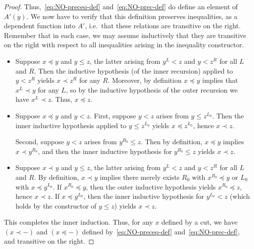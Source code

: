 \begin{proof}
  Thus,~\eqref{eq:NO-preceq-def} and~\eqref{eq:NO-prec-def} do define an element of $A'(y)$.
  We now have to verify that this definition preserves inequalities, as a dependent function into $A'$, i.e.\ that these relations are transitive on the right.
  Remember that in each case, we may assume inductively that they are transitive on the right with respect to all inequalities arising in the inequality constructor.
  \begin{itemize}
  \item Suppose $x\preceq y$ and $y\le z$, the latter arising from $y^L<z$ and $y<z^R$ for all $L$ and $R$.
    Then the inductive hypothesis (of the inner recursion) applied to $y<z^R$ yields $x\prec z^R$ for any $R$.
    Moreover, by definition $x\preceq y$ implies that $x^L \prec y$ for any $L$, so by the inductive hypothesis of the outer recursion we have $x^L \prec z$.
    Thus, $x\preceq z$.
  \item Suppose $x\preceq y$ and $y<z$.
    First, suppose $y<z$ arises from $y\le z^{L_0}$.
    Then the inner inductive hypothesis applied to $y\le z^{L_0}$ yields $x \preceq z^{L_0}$, hence $x\prec z$.

    Second, suppose $y<z$ arises from $y^{R_0}\le z$.
    Then by definition, $x\preceq y$ implies $x\prec y^{R_0}$, and then the inner inductive hypothesis for $y^{R_0}\le z$ yields $x\prec z$.
  \item Suppose $x\prec y$ and $y\le z$, the latter arising from $y^L<z$ and $y<z^R$ for all $L$ and $R$.
    By definition, $x\prec y$ implies there merely exists $R_0$ with $x^{R_0}\preceq y$ or $L_0$ with $x\preceq y^{L_0}$.
    If $x^{R_0}\preceq y$, then the outer inductive hypothesis yields $x^{R_0}\preceq z$, hence $x\prec z$.
    If $x\preceq y^{L_0}$, then the inner inductive hypothesis for $y^{L_0}<z$ (which holds by the constructor of $y\le z$) yields $x\prec z$.

  \end{itemize}
  This completes the inner induction.
  Thus, for any $x$ defined by a cut, we have $(x\prec -)$ and $(x\preceq -)$ defined by~\eqref{eq:NO-preceq-def} and~\eqref{eq:NO-prec-def}, and transitive on the right.


\end{proof}
